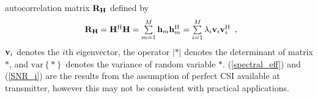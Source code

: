 \documentclass[10pt,fleqn, twocolumn]{IEEEtran}
\newcommand{\bh}{{\bf h}}
\newcommand{\bH}{{\bf H}}
\newcommand{\bv}{{\bf v}}
\newcommand{\bR}{{\bf R}}
\begin{document}
autocorrelation matrix $\bR_{\bH}$ defined by
\begin{equation}
\begin{array}{l}
\bR_{\bH}=\bH^{\rm H}\bH=\sum\limits_{m=1}^{M}\bh_{m}\bh_{m}^{\rm
H}=\sum\limits_{i=1}^{M}\lambda_{i}\bv_{i}\bv_{i}^{\rm H}
\end{array},\label{R_h}
\end{equation}
\noindent $\bv_{i}$ denotes the $i$th eigenvector, the operator
$\left|\ast\right|$ denotes the determinant of matrix $\ast$, and
$\mbox{var}\left\{\ast\right\}$ denotes the variance of random
variable $\ast$. (\ref{spectral_eff}) and (\ref{SNR_i}) are the
results from the assumption of perfect CSI available at
transmitter, however this may not be consistent with practical
applications.

\begin{figure}
\end{figure}
\end{document}
